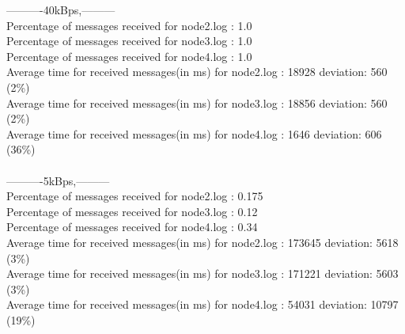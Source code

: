         ----------40kBps,---------\\
        Percentage of messages received for node2.log : 1.0\\
        Percentage of messages received for node3.log : 1.0\\
        Percentage of messages received for node4.log : 1.0\\
        Average time for received messages(in ms) for  node2.log : 18928 	deviation: 560 (2\%)\\
        Average time for received messages(in ms) for  node3.log : 18856 	deviation: 560 (2\%)\\
        Average time for received messages(in ms) for  node4.log : 1646 	deviation: 606 (36\%)\\\\
        ----------5kBps,---------\\
        Percentage of messages received for node2.log : 0.175\\
        Percentage of messages received for node3.log : 0.12\\
        Percentage of messages received for node4.log : 0.34\\
        Average time for received messages(in ms) for  node2.log : 173645 	deviation: 5618 (3\%)\\
        Average time for received messages(in ms) for  node3.log : 171221 	deviation: 5603 (3\%)\\
        Average time for received messages(in ms) for  node4.log : 54031 	deviation: 10797 (19\%)\\\\
